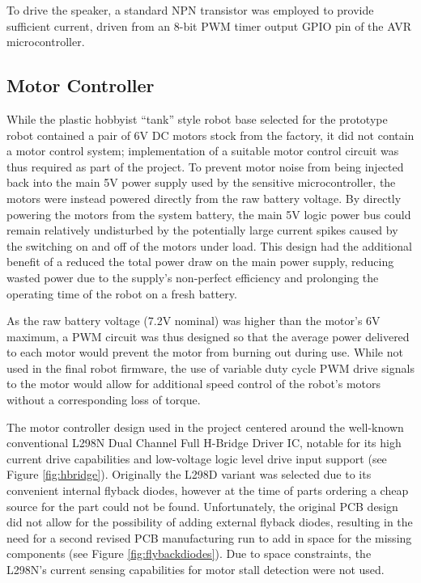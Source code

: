 To drive the speaker, a standard NPN transistor was employed to provide sufficient current, driven from an 8-bit PWM timer output GPIO pin of the AVR microcontroller.

\FloatBarrier
\subsection{Motor Controller}

While the plastic hobbyist ``tank'' style robot base selected for the prototype robot contained a pair of 6V DC motors stock from the factory, it did not contain a motor control system; implementation of a suitable motor control circuit was thus required as part of the project. To prevent motor noise from being injected back into the main 5V power supply used by the sensitive microcontroller, the motors were instead powered directly from the raw battery voltage. By directly powering the motors from the system battery, the main 5V logic power bus could remain relatively undisturbed by the potentially large current spikes caused by the switching on and off of the motors under load. This design had the additional benefit of a reduced the total power draw on the main power supply, reducing wasted power due to the supply's non-perfect efficiency and prolonging the operating time of the robot on a fresh battery.

As the raw battery voltage (7.2V nominal) was higher than the motor's 6V maximum, a PWM circuit was thus designed so that the average power delivered to each motor would prevent the motor from burning out during use. While not used in the final robot firmware, the use of variable duty cycle PWM drive signals to the motor would allow for additional speed control of the robot's motors without a corresponding loss of torque.

The motor controller design used in the project centered around the well-known conventional L298N Dual Channel Full H-Bridge Driver IC, notable for its high current drive capabilities and low-voltage logic level drive input support (see Figure \ref{fig:hbridge}). Originally the L298D variant was selected due to its convenient internal flyback diodes, however at the time of parts ordering a cheap source for the part could not be found. Unfortunately, the original PCB design did not allow for the possibility of adding external flyback diodes, resulting in the need for a second revised PCB manufacturing run to add in space for the missing components (see Figure \ref{fig:flybackdiodes}). Due to space constraints, the L298N's current sensing capabilities for motor stall detection were not used.

